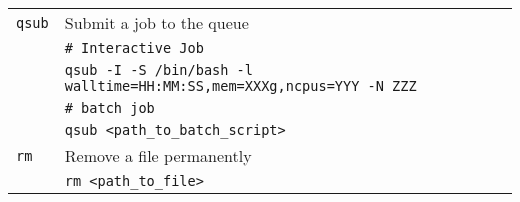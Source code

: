 \begin{table}[!h]
\begin{tabular}{ L{3cm}  L{9cm}}
    \\[2ex]
    \texttt{qsub} & Submit a job to the queue\\
                     & \texttt{\# Interactive Job}
    \\
                     & \texttt{qsub -I -S /bin/bash -l walltime=HH:MM:SS,mem=XXXg,ncpus=YYY -N ZZZ}
    \\
                     & \texttt{\# batch job}
    \\
                     & \texttt{qsub <path\_to\_batch\_script>}
    \\[2ex]
    \texttt{rm} & Remove a file permanently\\
                     & \texttt{rm <path\_to\_file>}
      \\
    \hline
  \end{tabular}
\end{table}
